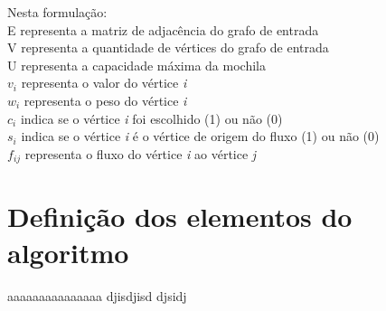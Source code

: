 \documentclass[14pt]{extarticle}
\begin{document}
Nesta formulação:\\
\hspace*{5ex} E representa a matriz de adjacência do grafo de entrada\\
\hspace*{5ex} V representa a quantidade de vértices do grafo de entrada\\
\hspace*{5ex} U representa a capacidade máxima da mochila\\
\hspace*{5ex} $v_i$ representa o valor do vértice \textit{i}\\
\hspace*{5ex} $w_i$ representa o peso do vértice \textit{i}\\
\hspace*{5ex} $c_i$ indica se o vértice \textit{i} foi escolhido (1) ou não (0)\\
\hspace*{5ex} $s_i$ indica se o vértice \textit{i} é o vértice de origem do fluxo (1) ou não (0)\\
\hspace*{5ex} $f_{ij}$ representa o fluxo do vértice \textit{i} ao vértice \textit{j}\\

\section{Definição dos elementos do algoritmo}
aaaaaaaaaaaaaaa djisdjisd djsidj
\end{document}
